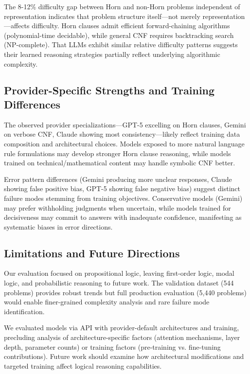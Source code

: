\documentclass[pdflatex,sn-mathphys-num]{sn-jnl}%
\theoremstyle{thmstyleone}%
\theoremstyle{thmstyletwo}%
\theoremstyle{thmstylethree}%
\begin{document}
The 8-12\% difficulty gap between Horn and non-Horn problems independent of representation indicates that problem structure itself—not merely representation—affects difficulty. Horn clauses admit efficient forward-chaining algorithms (polynomial-time decidable), while general CNF requires backtracking search (NP-complete). That LLMs exhibit similar relative difficulty patterns suggests their learned reasoning strategies partially reflect underlying algorithmic complexity.

\subsection{Provider-Specific Strengths and Training Differences}\label{subsec:disc-providers}

The observed provider specializations—GPT-5 excelling on Horn clauses, Gemini on verbose CNF, Claude showing most consistency—likely reflect training data composition and architectural choices. Models exposed to more natural language rule formulations may develop stronger Horn clause reasoning, while models trained on technical/mathematical content may handle symbolic CNF better.

Error pattern differences (Gemini producing more unclear responses, Claude showing false positive bias, GPT-5 showing false negative bias) suggest distinct failure modes stemming from training objectives. Conservative models (Gemini) may prefer withholding judgments when uncertain, while models trained for decisiveness may commit to answers with inadequate confidence, manifesting as systematic biases in error directions.

\subsection{Limitations and Future Directions}\label{subsec:limitations}

Our evaluation focused on propositional logic, leaving first-order logic, modal logic, and probabilistic reasoning to future work. The validation dataset (544 problems) provides robust trends but full production evaluation (5,440 problems) would enable finer-grained complexity analysis and rare failure mode identification.

We evaluated models via API with provider-default architectures and training, precluding analysis of architecture-specific factors (attention mechanisms, layer depth, parameter counts) or training factors (pre-training vs. fine-tuning contributions). Future work should examine how architectural modifications and targeted training affect logical reasoning capabilities.
\end{document}
